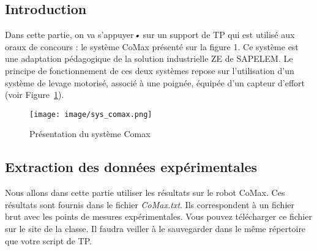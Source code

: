 \subsection{Introduction}

Dans cette partie, on va s’appuyer\emph{•} sur un support de TP qui est utilisé aux oraux de concours : le système CoMax présenté sur la figure 1. Ce système est une adaptation pédagogique de la solution industrielle ZE de SAPELEM. Le principe de fonctionnement de ces deux systèmes repose sur l’utilisation d’un système de levage motorisé, associé à une poignée, équipée d'un capteur d’effort (voir Figure~\ref{sys_comax}).

\begin{figure}[!h]
\centering
\texttt{[image: image/sys\_comax.png]}
\caption{Présentation du système Comax}
\label{sys_comax}
\end{figure}

\subsection{Extraction des données expérimentales}

Nous allons dans cette partie utiliser les résultats  sur le robot CoMax. Ces résultats sont fournis dans le fichier \textit{CoMax.txt}. Ils correspondent à un fichier brut avec les points de mesures expérimentales. Vous pouvez télécharger ce fichier sur le site de la classe. Il faudra veiller à le sauvegarder dans le même répertoire que votre script de TP.





